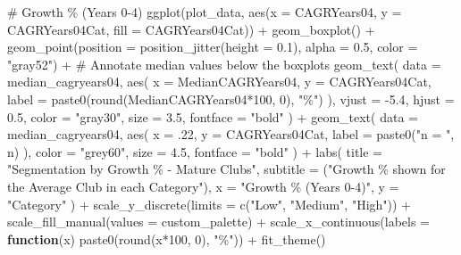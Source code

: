 \documentclass[
  letterpaper,
  oneside,
  11pt]{article}
\newenvironment{Shaded}{\begin{snugshade}}{\end{snugshade}}
\newcommand{\AttributeTok}[1]{\textcolor[rgb]{0.40,0.45,0.13}{#1}}
\newcommand{\CommentTok}[1]{\textcolor[rgb]{0.37,0.37,0.37}{#1}}
\newcommand{\ControlFlowTok}[1]{\textcolor[rgb]{0.00,0.23,0.31}{\textbf{#1}}}
\newcommand{\DecValTok}[1]{\textcolor[rgb]{0.68,0.00,0.00}{#1}}
\newcommand{\FloatTok}[1]{\textcolor[rgb]{0.68,0.00,0.00}{#1}}
\newcommand{\FunctionTok}[1]{\textcolor[rgb]{0.28,0.35,0.67}{#1}}
\newcommand{\NormalTok}[1]{\textcolor[rgb]{0.00,0.23,0.31}{#1}}
\newcommand{\SpecialCharTok}[1]{\textcolor[rgb]{0.37,0.37,0.37}{#1}}
\newcommand{\StringTok}[1]{\textcolor[rgb]{0.13,0.47,0.30}{#1}}
\begin{document}
\begin{Shaded}
\begin{Highlighting}[]
\CommentTok{\# Growth \% (Years 0{-}4)}
\FunctionTok{ggplot}\NormalTok{(plot\_data, }\FunctionTok{aes}\NormalTok{(}\AttributeTok{x =}\NormalTok{ CAGRYears04, }\AttributeTok{y =}\NormalTok{ CAGRYears04Cat, }\AttributeTok{fill =}\NormalTok{ CAGRYears04Cat)) }\SpecialCharTok{+}
  \FunctionTok{geom\_boxplot}\NormalTok{() }\SpecialCharTok{+}
  \FunctionTok{geom\_point}\NormalTok{(}\AttributeTok{position =} \FunctionTok{position\_jitter}\NormalTok{(}\AttributeTok{height =} \FloatTok{0.1}\NormalTok{), }
             \AttributeTok{alpha =} \FloatTok{0.5}\NormalTok{, }
             \AttributeTok{color =} \StringTok{"gray52"}\NormalTok{) }\SpecialCharTok{+}
  \CommentTok{\# Annotate median values below the boxplots}
  \FunctionTok{geom\_text}\NormalTok{(}
    \AttributeTok{data =}\NormalTok{ median\_cagryears04,}
    \FunctionTok{aes}\NormalTok{(}
      \AttributeTok{x =}\NormalTok{ MedianCAGRYears04,}
      \AttributeTok{y =}\NormalTok{ CAGRYears04Cat,}
      \AttributeTok{label =} \FunctionTok{paste0}\NormalTok{(}\FunctionTok{round}\NormalTok{(MedianCAGRYears04}\SpecialCharTok{*}\DecValTok{100}\NormalTok{, }\DecValTok{0}\NormalTok{), }\StringTok{"\%"}\NormalTok{)}
\NormalTok{    ),}
    \AttributeTok{vjust =} \SpecialCharTok{{-}}\FloatTok{5.4}\NormalTok{,}
    \AttributeTok{hjust =} \FloatTok{0.5}\NormalTok{,}
    \AttributeTok{color =} \StringTok{"gray30"}\NormalTok{,}
    \AttributeTok{size =} \FloatTok{3.5}\NormalTok{,}
    \AttributeTok{fontface =} \StringTok{"bold"}
\NormalTok{  ) }\SpecialCharTok{+}
  \FunctionTok{geom\_text}\NormalTok{(}
    \AttributeTok{data =}\NormalTok{ median\_cagryears04,}
    \FunctionTok{aes}\NormalTok{(}
      \AttributeTok{x =}\NormalTok{ .}\DecValTok{22}\NormalTok{,}
      \AttributeTok{y =}\NormalTok{ CAGRYears04Cat,}
      \AttributeTok{label =} \FunctionTok{paste0}\NormalTok{(}\StringTok{"n = "}\NormalTok{, n)}
\NormalTok{    ),}
    \AttributeTok{color =} \StringTok{"grey60"}\NormalTok{,}
    \AttributeTok{size =} \FloatTok{4.5}\NormalTok{,}
    \AttributeTok{fontface =} \StringTok{"bold"}
\NormalTok{  ) }\SpecialCharTok{+}
  \FunctionTok{labs}\NormalTok{(}
    \AttributeTok{title =} \StringTok{"Segmentation by Growth \% {-} Mature Clubs"}\NormalTok{,}
    \AttributeTok{subtitle =}\NormalTok{ (}\StringTok{"Growth \% shown for the Average Club in each Category"}\NormalTok{),}
    \AttributeTok{x =} \StringTok{"Growth \% (Years 0{-}4)"}\NormalTok{,}
    \AttributeTok{y =} \StringTok{"Category"}
\NormalTok{  ) }\SpecialCharTok{+}
  \FunctionTok{scale\_y\_discrete}\NormalTok{(}\AttributeTok{limits =} \FunctionTok{c}\NormalTok{(}\StringTok{"Low"}\NormalTok{, }\StringTok{"Medium"}\NormalTok{, }\StringTok{"High"}\NormalTok{)) }\SpecialCharTok{+}
  \FunctionTok{scale\_fill\_manual}\NormalTok{(}\AttributeTok{values =}\NormalTok{ custom\_palette) }\SpecialCharTok{+}
  \FunctionTok{scale\_x\_continuous}\NormalTok{(}\AttributeTok{labels =} \ControlFlowTok{function}\NormalTok{(x) }\FunctionTok{paste0}\NormalTok{(}\FunctionTok{round}\NormalTok{(x}\SpecialCharTok{*}\DecValTok{100}\NormalTok{, }\DecValTok{0}\NormalTok{), }\StringTok{"\%"}\NormalTok{)) }\SpecialCharTok{+}
  \FunctionTok{fit\_theme}\NormalTok{()}
\end{Highlighting}
\end{Shaded}
\end{document}
